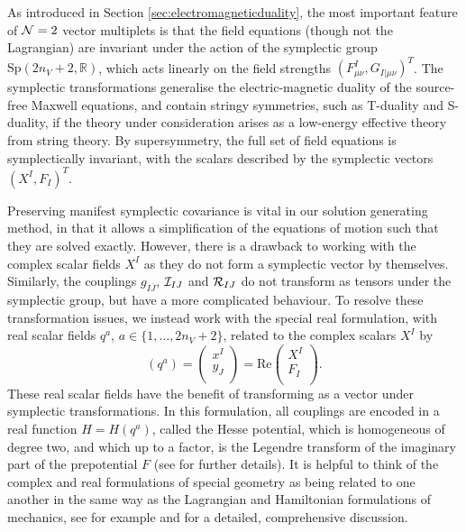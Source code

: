 As introduced in Section \ref{sec:electromagneticduality}, the most important feature of ${\cal N}=2$ vector multiplets is that the field equations (though not the Lagrangian) are invariant under the action of the symplectic group $\text{Sp}(2n_V+2, \mathbb{R})$, which acts linearly on the field strengths $(F^{I}_{\mu \nu}, G_{I|\mu \nu})^T$. The symplectic transformations generalise the electric-magnetic duality of the source-free Maxwell equations, and contain stringy symmetries, such as T-duality and S-duality, if the theory under consideration arises as a low-energy effective theory from string theory. By supersymmetry, the full set of field equations is symplectically invariant, with the scalars described by the symplectic vectors $(X^I, F_I)^T$.

Preserving manifest symplectic covariance is vital in our solution generating method, in that it allows a simplification of the equations of motion such that they are solved exactly. However, there is a drawback to working with the complex scalar fields $X^I$ as they do not form a symplectic vector by themselves. Similarly, the couplings $g_{I\bar{J}}$, ${\cal I}_{IJ}$ and ${\cal R}_{IJ}$ do not transform as tensors under the symplectic group, but have a more complicated behaviour. To resolve these transformation issues, we instead work with the special real formulation, with real scalar fields $q^a$, $a \in \{1, \ldots, 2n_V+2\}$, related to the complex scalars $X^I$ by
\[
 (q^a) = \left( \begin{array}{c}
          x^I \\ y_J \\
          \end{array} \right) = \mbox{Re}
         \left( \begin{array}{c}
             X^I \\ F_I \\
            \end{array} \right) .
\]
These real scalar fields have the benefit of transforming as a vector under symplectic transformations. In this formulation, all couplings are encoded in a real function $H=H(q^a)$, called the Hesse potential, which is homogeneous of degree two, and which up to a factor, is the Legendre transform of the imaginary part of the prepotential $F$ (see \cite{Mohaupt:2011aa} for further details). It is helpful to think of the complex and real formulations of special geometry as being related to one another in the same way as the Lagrangian and Hamiltonian formulations of mechanics, see for example \cite{Cardoso:2012nh} and \cite{LopesCardoso:2019mlj} for a detailed, comprehensive discussion. 

